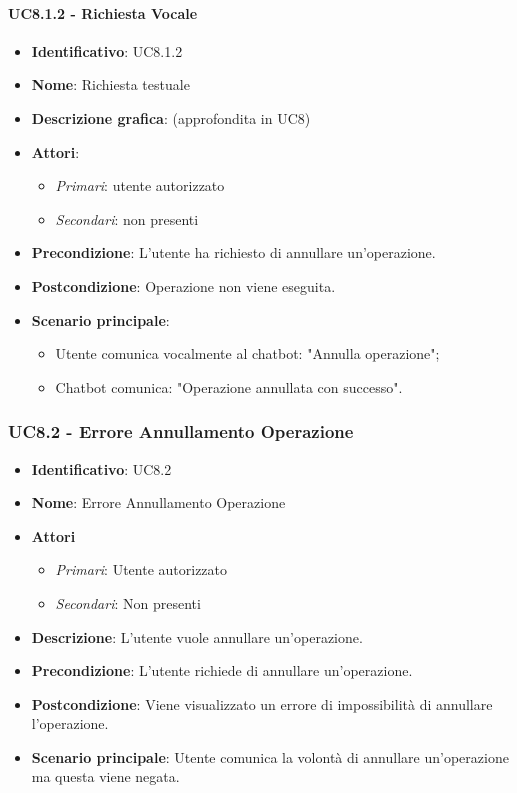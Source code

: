 \paragraph{UC8.1.2 - Richiesta Vocale}
\begin{itemize}
   \item \textbf{Identificativo}: UC8.1.2
   \item \textbf{Nome}: Richiesta testuale
   \item \textbf{Descrizione grafica}: (approfondita in UC8)
   \item \textbf{Attori}:
   \begin{itemize} 
       \item \textit{Primari}: utente autorizzato
       \item \textit{Secondari}: non presenti
   \end{itemize}
       \item \textbf{Precondizione}: L'utente ha richiesto di annullare un'operazione.
       \item \textbf{Postcondizione}: Operazione non viene eseguita. 
    \item \textbf{Scenario principale}: 
       \begin{itemize}
        \item Utente comunica vocalmente al chatbot: "Annulla operazione";
        \item Chatbot comunica: "Operazione annullata con successo".
       \end{itemize}
\end{itemize}

\subsubsection{UC8.2 - Errore Annullamento Operazione}
\begin{itemize}
	\item \textbf{Identificativo}: UC8.2
	\item \textbf{Nome}: Errore Annullamento Operazione 
	\item \textbf{Attori}
	\begin{itemize} 
		\item \textit{Primari}: Utente autorizzato
		\item \textit{Secondari}: Non presenti
	\end{itemize}
	\item \textbf{Descrizione}: L'utente vuole annullare un'operazione.
	\item \textbf{Precondizione}: L'utente richiede di annullare un'operazione.
	\item \textbf{Postcondizione}: Viene visualizzato un errore di impossibilità di annullare l'operazione.
	\item \textbf{Scenario principale}: Utente comunica la volontà di annullare un'operazione ma questa viene negata.
\end{itemize}
\newpage